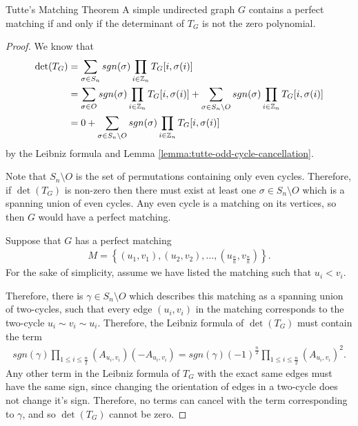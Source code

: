 \begin{thm}{Tutte's Matching Theorem}\label{thm:tutte-matching}\proofbreak
    A simple undirected graph $G$ contains a perfect matching if and only if the determinant of $T_G$ is not the zero polynomial.
\end{thm}

\begin{proof}
    We know that
    \begin{align*}
        \det(T_G) &= \sum_{\sigma\in S_n}sgn(\sigma)\prod_{i\in\mathbb{Z}_n}T_G[i,\sigma(i)] \\
        &= \sum_{\sigma\in O}sgn(\sigma)\prod_{i\in\mathbb{Z}_n}T_G[i,\sigma(i)] + \sum_{\sigma\in S_n\setminus O}sgn(\sigma)\prod_{i\in\mathbb{Z}_n}T_G[i,\sigma(i)] \\
        &= 0 + \sum_{\sigma\in S_n\setminus O}sgn(\sigma)\prod_{i\in\mathbb{Z}_n}T_G[i,\sigma(i)]
    \end{align*}
    by the Leibniz formula and Lemma \ref{lemma:tutte-odd-cycle-cancellation}.

    Note that $S_n\setminus O$ is the set of permutations containing only even cycles. Therefore, if $\det(T_G)$ is non-zero then there must exist at least one $\sigma \in S_n\setminus O$ which is a spanning union of even cycles. Any even cycle is a matching on its vertices, so then $G$ would have a perfect matching.

    Suppose that $G$ has a perfect matching
    \begin{align*}
        M = \left\{(u_1, v_1), (u_2, v_2), \ldots, (u_{\frac{n}{n}}, v_{\frac{n}{n}})\right\}.
    \end{align*}
    For the sake of simplicity, assume we have listed the matching such that $u_i < v_i$.

    Therefore, there is $\gamma \in S_n\setminus O$ which describes this matching as a spanning union of two-cycles, such that every edge $(u_i, v_i)$ in the matching corresponds to the two-cycle $u_i \sim v_i \sim u_i$. Therefore, the Leibniz formula of $\det(T_G)$ must contain the term
    \begin{align*}
        sgn(\gamma)\prod_{1\leq i\leq\frac{n}{2}}\left(A_{u_i,v_i}\right)\left(-A_{u_i,v_i}\right) = sgn(\gamma)\left(-1\right)^{\frac{n}{2}}\prod_{1\leq i\leq\frac{n}{2}}\left(A_{u_i,v_i}\right)^2.
    \end{align*}
    Any other term in the Leibniz formula of $T_G$ with the exact same edges must have the same sign, since changing the orientation of edges in a two-cycle does not change it's sign. Therefore, no terms can cancel with the term corresponding to $\gamma$, and so $\det(T_G)$ cannot be zero.
\end{proof}

